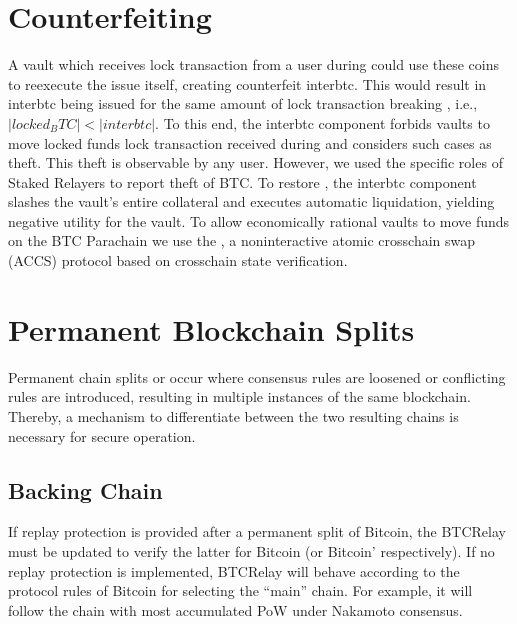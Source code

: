 \documentclass[a4paper,10pt,english]{sphinxmanual}
\begin{document}
\section{Counterfeiting}
\label{\detokenize{security_performance/security-analysis:counterfeiting}}
A vault which receives lock transaction from a user during {\hyperref[\detokenize{spec/issue:issue-protocol}]{}} could use these coins to re\sphinxhyphen{}execute the issue itself, creating counterfeit interbtc.
This would result in interbtc being issued for the same amount of lock transaction breaking , i.e., \(|locked_BTC| < |interbtc|\).
To this end, the interbtc component forbids vaults to move locked funds lock transaction received during {\hyperref[\detokenize{spec/issue:issue-protocol}]{}} and considers such cases as theft.
This theft is observable by any user.
However, we used the specific roles of Staked Relayers to report theft of BTC.
To restore , the interbtc component slashes the vault’s entire collateral and executes automatic liquidation, yielding negative utility for the vault.
To allow economically rational vaults to move funds on the BTC Parachain we use the {\hyperref[\detokenize{spec/replace:replace-protocol}]{}}, a non\sphinxhyphen{}interactive atomic cross\sphinxhyphen{}chain swap (ACCS) protocol based on cross\sphinxhyphen{}chain state verification.


\section{Permanent Blockchain Splits}
\label{\detokenize{security_performance/security-analysis:permanent-blockchain-splits}}
Permanent chain splits or  occur where consensus rules are loosened or conflicting rules are introduced, resulting in multiple instances of the same blockchain.
Thereby, a mechanism to differentiate between the two resulting chains  is necessary for secure operation.


\subsection{Backing Chain}
\label{\detokenize{security_performance/security-analysis:backing-chain}}
If replay protection is provided after a permanent split of Bitcoin, the BTC\sphinxhyphen{}Relay must be updated to verify the latter for Bitcoin (or Bitcoin’ respectively).
If no replay protection is implemented, BTC\sphinxhyphen{}Relay will behave according to the protocol rules of Bitcoin for selecting the “main” chain. For example, it will follow the chain with most accumulated PoW under Nakamoto consensus.
\end{document}
